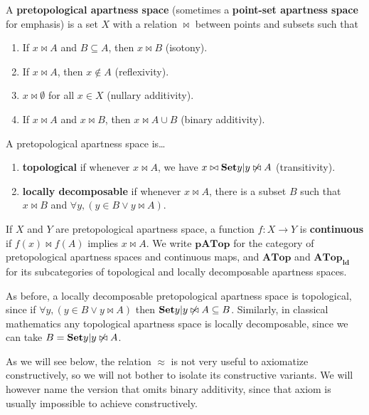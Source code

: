 \documentclass{article}
\def\cpl#1{\neg #1}
\def\nn{\ensuremath{\neg\neg}}
\def\APTop{\mathbf{pATop}}
\def\ATop{\mathbf{ATop}}
\def\APTopnn{\mathbf{pATop}_{\nn}}
\def\ldATop{\mathbf{ATop}_{\mathbf{ld}}}
\begin{document}
\begin{defn}
  A \textbf{pretopological apartness space} (sometimes a \textbf{point-set apartness space} for emphasis) is a set $X$ with a relation $\bowtie$ between points and subsets such that
  \begin{enumerate}
  \item If $x\bowtie A$ and $B\subseteq A$, then $x\bowtie B$ (isotony).
  \item If $x\bowtie A$, then $x\notin A$ (reflexivity).
  \item $x\bowtie \emptyset$ for all $x\in X$ (nullary additivity).
  \item If $x\bowtie A$ and $x\bowtie B$, then $x\bowtie A\cup B$ (binary additivity).
  \end{enumerate}
  A pretopological apartness space is\dots
  \begin{enumerate}[resume]
  \item \textbf{topological} if whenever $x\bowtie A$, we have $x\bowtie \setof{ y | y \not\bowtie A }$ (transitivity).
  \item \textbf{locally decomposable} if whenever $x\bowtie A$, there is a subset $B$ such that $x\bowtie B$ and $\forall y, (y\in B \lor y\bowtie A)$.
  \end{enumerate}
  If $X$ and $Y$ are pretopological apartness space, a function $f:X\to Y$ is \textbf{continuous} if $f(x)\bowtie f(A)$ implies $x\bowtie A$.
  We write $\APTop$ for the category of pretopological apartness spaces and continuous maps, and $\ATop$
  and $\ldATop$ for its subcategories of topological %
  and locally decomposable apartness spaces.
\end{defn}

As before, a locally decomposable pretopological apartness space is topological, since if $\forall y, (y\in B \lor y\bowtie A)$ then $\setof{ y | y \not\bowtie A } \subseteq B$.
Similarly, in classical mathematics any topological apartness space is locally decomposable, since we can take $B = \setof{y|y\not\bowtie A}$.

As we will see below, the relation $\approx$ is not very useful to axiomatize constructively, so we will not bother to isolate its constructive variants.
We will however name the version that omits binary additivity, since that axiom is usually impossible to achieve constructively.
\end{document}
